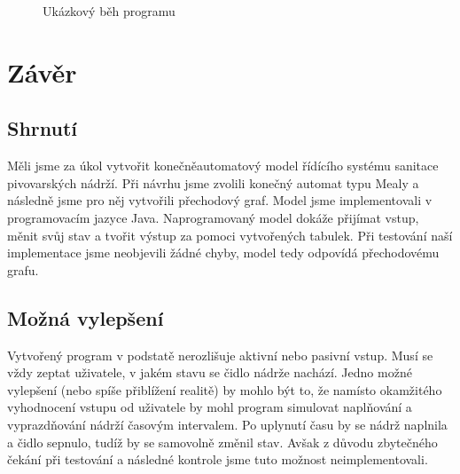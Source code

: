 \documentclass[12pt]{report}
\begin{document}
	\begin{figure}
		\centering
		\caption{Ukázkový běh programu}
		\label{fig:beh}
	\end{figure}


	\chapter{Závěr}
	
	\section{Shrnutí}
	Měli jsme za úkol vytvořit konečněautomatový model řídícího systému sanitace pivovarských nádrží. Při návrhu jsme zvolili konečný automat typu Mealy a následně jsme pro něj vytvořili přechodový graf. Model jsme implementovali v programovacím jazyce Java. Naprogramovaný model dokáže přijímat vstup, měnit svůj stav a tvořit výstup za pomoci vytvořených tabulek. Při testování naší implementace jsme neobjevili žádné chyby, model tedy odpovídá přechodovému grafu.
	
	\section{Možná vylepšení}
	Vytvořený program v podstatě nerozlišuje aktivní nebo pasivní vstup. Musí se vždy zeptat uživatele, v jakém stavu se čidlo nádrže nachází. Jedno možné vylepšení (nebo spíše přiblížení realitě) by mohlo být to, že namísto okamžitého vyhodnocení vstupu od uživatele by mohl program simulovat naplňování a vyprazdňování nádrží časovým intervalem. Po uplynutí času by se nádrž naplnila a čidlo sepnulo, tudíž by se samovolně změnil stav. Avšak z důvodu zbytečného čekání při testování a následné kontrole jsme tuto možnost neimplementovali.
	
\end{document}
